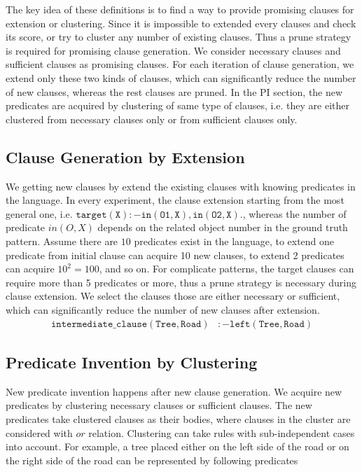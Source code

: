 \documentclass[
]{ceurart}
\begin{document}
The key idea of these definitions is to find a way to provide promising clauses for extension or clustering. Since it is impossible to extended every clauses and check its score, or try to cluster any number of existing clauses. Thus a prune strategy is required for promising clause generation. We consider necessary clauses and sufficient clauses as promising clauses. For each iteration of clause generation, we extend only these two kinds of clauses, which can significantly reduce the number of new clauses, whereas the rest clauses are pruned. In the PI section, the new predicates are acquired by clustering of same type of clauses, i.e. they are either clustered from necessary clauses only or from sufficient clauses only.




\subsection{Clause Generation by Extension}
We getting new clauses by extend the existing clauses with knowing predicates in the language. In every experiment, the clause extension starting from the most general one, i.e. $ \mathtt{target(X):-in(O1,X),in(O2,X).} $, whereas the number of predicate $ in(O,X) $ depends on the related object number in the ground truth pattern. Assume there are $ 10 $ predicates exist in the language, to extend one predicate from initial clause can acquire 10 new clauses, to extend 2 predicates can acquire $ 10^2=100 $, and so on. For complicate patterns, the target clauses can require more than 5 predicates or more, thus a prune strategy is necessary during clause extension. We select the clauses those are either necessary or sufficient, which can significantly reduce the number of new clauses after extension.
\begin{align*}
	\mathtt{intermediate\_clause(Tree,Road)}&\mathtt{:-left(Tree,Road)}
\end{align*}

\subsection{Predicate Invention by Clustering}
New predicate invention happens after new clause generation. We acquire new predicates by clustering necessary clauses or sufficient clauses. The new predicates take clustered clauses as their bodies, where clauses in the cluster are considered with $ or $ relation. Clustering can take rules with sub-independent cases into account. For example, a tree placed either on the left side of the road or on the right side of the road can be represented by following predicates
\end{document}
